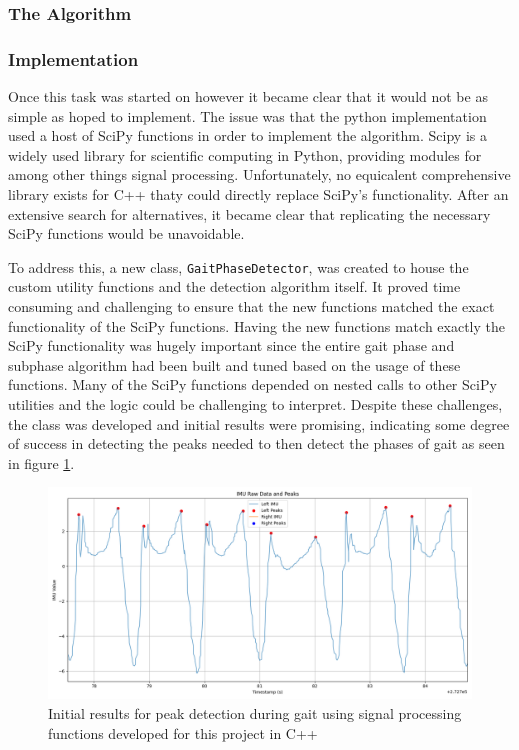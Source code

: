 \subsubsection{The Algorithm}

\subsubsection{Implementation}

Once this task was started on however it became clear that it would not be as simple as hoped to implement. The issue was that the python implementation used a host of SciPy \cite{noauthor_scipy_nodate} functions in order to implement the algorithm. Scipy is a  widely used library for scientific computing in Python, providing modules for among other things signal processing. Unfortunately, no equicalent comprehensive library exists for C++ thaty could directly replace SciPy's functionality. After an extensive search for alternatives, it became clear that replicating the necessary SciPy functions would be unavoidable.

To address this, a new class, \texttt{GaitPhaseDetector}, was created to house the custom utility functions and the detection algorithm itself. It proved time consuming and challenging to ensure that the new functions matched the exact functionality of the SciPy functions. Having the new functions match exactly the SciPy functionality was hugely important since the entire gait phase and subphase algorithm had been built and tuned based on the usage of these functions. Many of the SciPy functions depended on nested calls to other SciPy utilities and the logic could be challenging to interpret. Despite these challenges, the class was developed and initial results were promising, indicating some degree of success in detecting the peaks needed to then detect the phases of gait as seen in figure \ref{fig:peaks}. 

\begin{figure}
    \centering
    \includegraphics[width=0.95\linewidth]{images/peaks_wz_13.12.24.png}
    \caption{Initial results for peak detection during gait using signal processing functions developed for this project in C++}
    \label{fig:peaks}
\end{figure}

